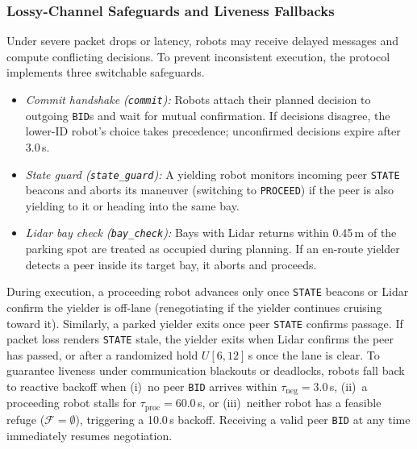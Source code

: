 \subsubsection{Lossy-Channel Safeguards and Liveness Fallbacks} 
Under severe packet drops or latency, robots may receive delayed messages and compute conflicting decisions. To prevent inconsistent execution, the protocol implements three switchable safeguards.
\begin{itemize}
\item \emph{Commit handshake (\texttt{commit}):} Robots attach their planned decision to outgoing \texttt{BID}s and wait for mutual confirmation. If decisions disagree, the lower-ID robot's choice takes precedence; unconfirmed decisions expire after 3.0\,s.
\item \emph{State guard (\texttt{state\_guard}):} A yielding robot monitors incoming peer \texttt{STATE} beacons and aborts its maneuver (switching to \texttt{PROCEED}) if the peer is also yielding to it or heading into the same bay.
\item \emph{Lidar bay check (\texttt{bay\_check}):} Bays with Lidar returns within 0.45\,m of the parking spot are treated as occupied during planning. If an en-route yielder detects a peer inside its target bay, it aborts and proceeds.
\end{itemize}
During execution, a proceeding robot advances only once \texttt{STATE} beacons or Lidar confirm the yielder is off-lane (renegotiating if the yielder continues cruising toward it). Similarly, a parked yielder exits once peer \texttt{STATE} confirms passage. If packet loss renders \texttt{STATE} stale, the yielder exits when Lidar confirms the peer has passed, or after a randomized hold $U[6,12]$\,s once the lane is clear.
To guarantee liveness under communication blackouts or deadlocks, robots fall back to reactive backoff when (i)~no peer \texttt{BID} arrives within $\tau_{\mathrm{neg}} = 3.0$\,s, (ii)~a proceeding robot stalls for $\tau_{\mathrm{proc}} = 60.0$\,s, or (iii)~neither robot has a feasible refuge ($\mathcal{F}=\emptyset$), triggering a 10.0\,s backoff. Receiving a valid peer \texttt{BID} at any time immediately resumes negotiation.

